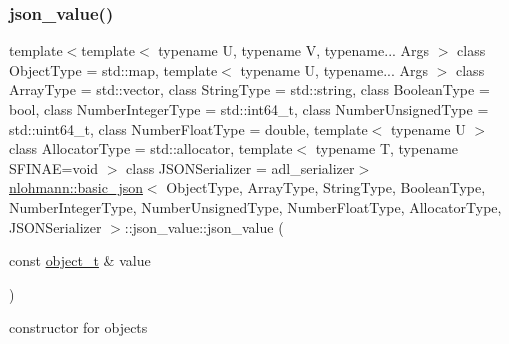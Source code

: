 \subsubsection{\texorpdfstring{json\+\_\+value()}{json\_value()}\hspace{0.1cm}{\footnotesize\ttfamily [9/12]}}
{\footnotesize\ttfamily template$<$template$<$ typename U, typename V, typename... Args $>$ class Object\+Type = std\+::map, template$<$ typename U, typename... Args $>$ class Array\+Type = std\+::vector, class String\+Type  = std\+::string, class Boolean\+Type  = bool, class Number\+Integer\+Type  = std\+::int64\+\_\+t, class Number\+Unsigned\+Type  = std\+::uint64\+\_\+t, class Number\+Float\+Type  = double, template$<$ typename U $>$ class Allocator\+Type = std\+::allocator, template$<$ typename T, typename S\+F\+I\+N\+A\+E=void $>$ class J\+S\+O\+N\+Serializer = adl\+\_\+serializer$>$ \\
\hyperlink{classnlohmann_1_1basic__json}{nlohmann\+::basic\+\_\+json}$<$ Object\+Type, Array\+Type, String\+Type, Boolean\+Type, Number\+Integer\+Type, Number\+Unsigned\+Type, Number\+Float\+Type, Allocator\+Type, J\+S\+O\+N\+Serializer $>$\+::json\+\_\+value\+::json\+\_\+value (\begin{DoxyParamCaption}\item[{const \hyperlink{classnlohmann_1_1basic__json_a5e48a7893520e1314bf0c9723e26ea2a}{object\+\_\+t} \&}]{value }\end{DoxyParamCaption})\hspace{0.3cm}{\ttfamily [inline]}}



constructor for objects 

\mbox{\label{unionnlohmann_1_1basic__json_1_1json__value_a82815d53bd7c983995fbcbe85131a110}} 
